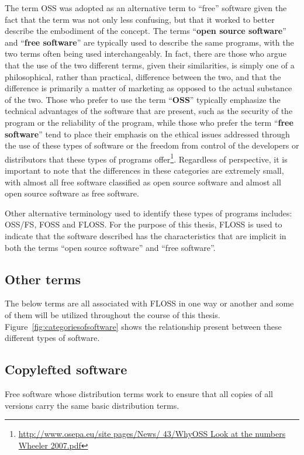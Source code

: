   The term \ac{OSS} was adopted as an alternative term to ``free'' software given the fact that the term was not only less confusing, but that it worked to better describe the embodiment of the concept. The terms ``\textbf{open source software}'' and ``\textbf{free software}'' are typically used to describe the same programs, with the two terms often being used interchangeably. In fact, there are those who argue that the use of the two different terms, given their similarities, is simply one of a philosophical, rather than practical, difference between the two, and that the difference is primarily a matter of marketing as opposed to the actual substance of the two. Those who prefer to use the term ``\textbf{OSS}'' typically emphasize the technical advantages of the software that are present, such as the security of the program or the reliability of the program, while those who prefer the term ``\textbf{free software}'' tend to place their emphasis on the ethical issues addressed through the use of these types of software or the freedom from control of the developers or distributors that these types of programs offer\footnote{\url{http://www.osepa.eu/site pages/News/ 43/WhyOSS Look at the numbers Wheeler 2007.pdf}}. Regardless of perspective, it is important to note that the differences in these categories are extremely small, with almost all free software classified as open source software and almost all open source software as free software. 
 
 Other alternative terminology used to identify these types of programs includes:   \ac{OSS/FS}, \ac{FOSS} and  \ac{FLOSS}.  For the purpose of this thesis, \ac{FLOSS} is used to indicate that the software described has the characteristics that are implicit in both the terms ``open source software'' and ``free software''.

  \subsection{Other terms}
  The below terms are all associated with FLOSS in one way or another and some of them will be utilized throughout the course of this thesis. Figure~\ref{fig:categoriesofsoftware} shows the relationship present between these different types of software.
     \subsection*{Copylefted software}
    Free software whose distribution terms work to ensure that all copies of all versions carry the same basic distribution terms.
